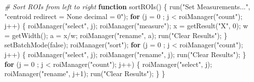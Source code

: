 \documentclass[10pt, b5paper, singlespacinge, twoside]{reedthesis} %
\newenvironment{Shaded}{}{}
\newcommand{\AttributeTok}[1]{#1}
\newcommand{\CommentTok}[1]{\textit{#1}}
\newcommand{\ControlFlowTok}[1]{\textbf{#1}}
\newcommand{\DecValTok}[1]{#1}
\newcommand{\FunctionTok}[1]{#1}
\newcommand{\NormalTok}[1]{#1}
\newcommand{\OtherTok}[1]{#1}
\newcommand{\SpecialCharTok}[1]{#1}
\newcommand{\StringTok}[1]{#1}
\theoremstyle{definition}
\theoremstyle{definition}
\theoremstyle{definition}
\theoremstyle{remark}
\begin{document}
\scriptsize
\begin{Shaded}
\begin{Highlighting}[numbers=left,,]
\CommentTok{\# Sort ROIs from left to right}
\ControlFlowTok{function} \FunctionTok{sortROIs}\NormalTok{() \{}
    \FunctionTok{run}\NormalTok{(}\StringTok{"Set Measurements..."}\NormalTok{, }\StringTok{"centroid redirect = None decimal = 0"}\NormalTok{);}
            \ControlFlowTok{for}\NormalTok{ (}\AttributeTok{j =} \DecValTok{0}\NormalTok{ ; j }\SpecialCharTok{\textless{}} \FunctionTok{roiManager}\NormalTok{(}\StringTok{"count"}\NormalTok{); j}\SpecialCharTok{++}\NormalTok{) \{}
                \FunctionTok{roiManager}\NormalTok{(}\StringTok{"select"}\NormalTok{, j);}
                \FunctionTok{roiManager}\NormalTok{(}\StringTok{"measure"}\NormalTok{);}
\NormalTok{                x }\OtherTok{=} \FunctionTok{getResult}\NormalTok{(}\StringTok{"X"}\NormalTok{, }\DecValTok{0}\NormalTok{);}
\NormalTok{                w }\OtherTok{=} \FunctionTok{getWidth}\NormalTok{();}
\NormalTok{                a }\OtherTok{=}\NormalTok{ x}\SpecialCharTok{/}\NormalTok{w;}
                \FunctionTok{roiManager}\NormalTok{(}\StringTok{"rename"}\NormalTok{, a);}
                \FunctionTok{run}\NormalTok{(}\StringTok{"Clear Results"}\NormalTok{);}
\NormalTok{                \}}
        \FunctionTok{setBatchMode}\NormalTok{(false);}
        \FunctionTok{roiManager}\NormalTok{(}\StringTok{"sort"}\NormalTok{); }
            \ControlFlowTok{for}\NormalTok{ (}\AttributeTok{j =} \DecValTok{0}\NormalTok{ ; j }\SpecialCharTok{\textless{}} \FunctionTok{roiManager}\NormalTok{(}\StringTok{"count"}\NormalTok{); j}\SpecialCharTok{++}\NormalTok{) \{}
                \FunctionTok{roiManager}\NormalTok{(}\StringTok{"select"}\NormalTok{, j);}
                \FunctionTok{roiManager}\NormalTok{(}\StringTok{"rename"}\NormalTok{, j);}
                \FunctionTok{run}\NormalTok{(}\StringTok{"Clear Results"}\NormalTok{);}
\NormalTok{                \}   }
            \ControlFlowTok{for}\NormalTok{ (}\AttributeTok{j =} \DecValTok{0}\NormalTok{ ; j }\SpecialCharTok{\textless{}} \FunctionTok{roiManager}\NormalTok{(}\StringTok{"count"}\NormalTok{); j}\SpecialCharTok{++}\NormalTok{) \{}
                \FunctionTok{roiManager}\NormalTok{(}\StringTok{"select"}\NormalTok{, j);}
                \FunctionTok{roiManager}\NormalTok{(}\StringTok{"rename"}\NormalTok{, j}\SpecialCharTok{+}\DecValTok{1}\NormalTok{);}
                \FunctionTok{run}\NormalTok{(}\StringTok{"Clear Results"}\NormalTok{);}
\NormalTok{                \}}
\NormalTok{\}}
\end{Highlighting}
\end{Shaded}
\normalsize
\end{document}
